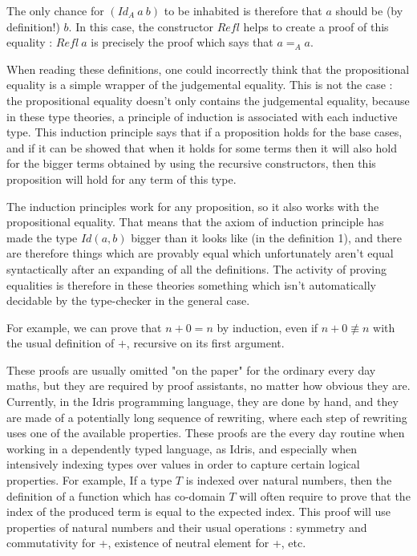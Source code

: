 The only chance for $(Id_A\ a\ b)$ to be inhabited is therefore that $a$ should be (by definition!) $b$. In this case, the constructor $Refl$ helps to create a proof of this equality : $Refl\ a$ is precisely the proof which says that $a=_Aa$. 

When reading these definitions, one could incorrectly think that the propositional equality is a simple wrapper of the judgemental equality. This is not the case : the propositional equality doesn't only contains the judgemental equality, because in these type theories, a principle of induction is associated with each inductive type. This induction principle says that if a proposition holds for the base cases, and if it can be showed that when it holds for some terms then it will also hold for the bigger terms obtained by using the recursive constructors, then this proposition will hold for any term of this type.

The induction principles work for any proposition, so it also works with the propositional equality. That means that the axiom of induction principle has made the type $Id(a,b)$ bigger than it looks like (in the definition 1), and there are therefore things which are provably equal which unfortunately aren't equal syntactically after an expanding of all the definitions. The activity of proving equalities is therefore in these theories something which isn't automatically decidable by the type-checker in the general case.

For example, we can prove that $n+0 = n$ by induction, even if $n+0 \not\equiv n$ with the usual definition of $+$, recursive on its first argument. 

These proofs are usually omitted "on the paper" for the ordinary every day maths, but they are required by proof assistants, no matter how obvious they are. Currently, in the Idris programming language, they are done by hand, and they are made of a potentially long sequence of rewriting, where each step of rewriting uses one of the available properties. 
These proofs are the every day routine when working in a dependently typed language, as Idris, and especially when intensively indexing types over values in order to capture certain logical properties.
For example, If a type $T$ is indexed over natural numbers, then the definition of a function which has co-domain $T$ will often require to prove that the index of the produced term is equal to the expected index. This proof will use properties of natural numbers and their usual operations : symmetry and commutativity for +, existence of neutral element for +, etc.

